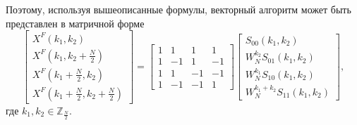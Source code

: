 Поэтому, используя вышеописанные формулы, векторный алгоритм может быть представлен в матричной форме
\begin{equation*}
\begin{bmatrix}
X^F(k_1, k_2) \\
X^F(k_1, k_2 + \frac{N}{2}) \\
X^F(k_1 + \frac{N}{2}, k_2) \\
X^F(k_1 + \frac{N}{2}, k_2 + \frac{N}{2})
\end{bmatrix}
=
\begin{bmatrix}
1 &  1 &  1 &  1 \\
1 & -1 &  1 & -1 \\
1 &  1 & -1 & -1 \\
1 & -1 & -1 &  1
\end{bmatrix}
\begin{bmatrix}
S_{00}(k_1, k_2) \\
W_N^{k_2} S_{01}(k_1, k_2) \\
W_N^{k_1} S_{10}(k_1, k_2) \\
W_N^{k_1 + k_2} S_{11}(k_1, k_2)
\end{bmatrix},
\end{equation*}
где $k_1, k_2 \in \mathbb{Z}_{\frac{N}{2}}$.

